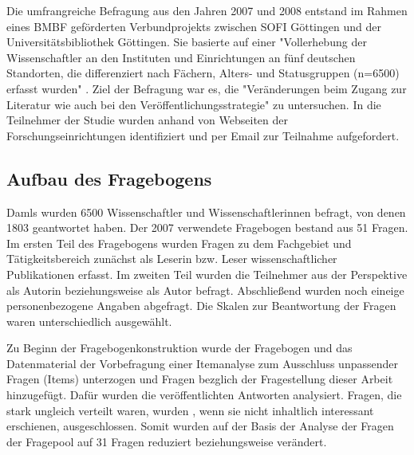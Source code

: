 Die umfrangreiche Befragung aus den Jahren 2007 und 2008 entstand im Rahmen eines BMBF geförderten Verbundprojekts zwischen SOFI Göttingen und der Universitätsbibliothek Göttingen. Sie basierte auf einer "Vollerhebung der Wissenschaftler an den Instituten und Einrichtungen an fünf deutschen Standorten, die differenziert nach Fächern, Alters- und Statusgruppen (n=6500) erfasst wurden" \cite{Hanekop_2014}. Ziel der Befragung war es, die "Veränderungen beim Zugang zur Literatur wie auch bei den Veröffentlichungsstrategie" \cite{Hanekop_Wittke_2007_Fragebogen} zu untersuchen. In die Teilnehmer der Studie wurden anhand von Webseiten der Forschungseinrichtungen identifiziert und per Email zur Teilnahme aufgefordert. 

\subsection{Aufbau des Fragebogens}
Damls wurden 6500 Wissenschaftler und Wissenschaftlerinnen befragt, von denen 1803 geantwortet haben. Der 2007 verwendete Fragebogen bestand aus 51 Fragen. Im ersten Teil des Fragebogens wurden Fragen zu dem Fachgebiet und Tätigkeitsbereich zunächst als Leserin bzw. Leser wissenschaftlicher Publikationen erfasst. Im zweiten Teil wurden die Teilnehmer aus der Perspektive als Autorin beziehungsweise als Autor befragt. Abschließend wurden noch eineige personenbezogene Angaben abgefragt. \cite{Hanekop_Wittke_2007_Fragebogen} Die Skalen zur Beantwortung der Fragen waren unterschiedlich ausgewählt. 

Zu Beginn der Fragebogenkonstruktion wurde der Fragebogen und das Datenmaterial der Vorbefragung einer Itemanalyse zum Ausschluss unpassender Fragen (Items) unterzogen und Fragen bezglich der Fragestellung dieser Arbeit hinzugefügt. Dafür wurden die veröffentlichten Antworten analysiert. Fragen, die stark ungleich verteilt waren, wurden , wenn sie nicht inhaltlich interessant erschienen, ausgeschlossen.  Somit wurden auf der Basis der Analyse der Fragen der Fragepool auf 31 Fragen reduziert beziehungsweise verändert.


